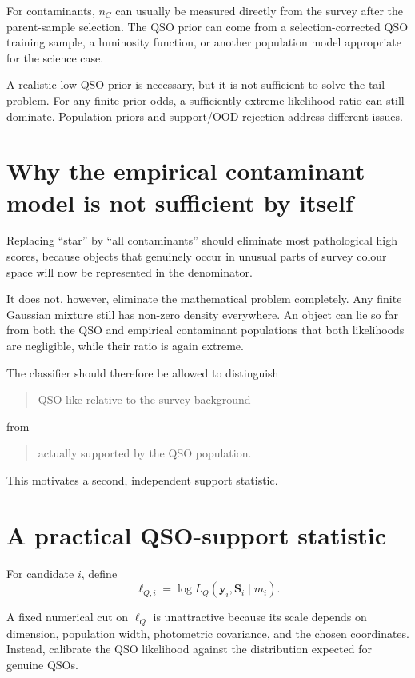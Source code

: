 \documentclass[11pt]{article}
\begin{document}
For contaminants, $n_C$ can usually be measured directly from the survey
after the parent-sample selection. The QSO prior can come from a
selection-corrected QSO training sample, a luminosity function, or another
population model appropriate for the science case.

A realistic low QSO prior is necessary, but it is not sufficient to solve the
tail problem. For any finite prior odds, a sufficiently extreme likelihood
ratio can still dominate. Population priors and support/OOD rejection address
different issues.

\section{Why the empirical contaminant model is not sufficient by itself}

Replacing ``star'' by ``all contaminants'' should eliminate most pathological
high scores, because objects that genuinely occur in unusual parts of survey
colour space will now be represented in the denominator.

It does not, however, eliminate the mathematical problem completely. Any
finite Gaussian mixture still has non-zero density everywhere. An object can
lie so far from both the QSO and empirical contaminant populations that both
likelihoods are negligible, while their ratio is again extreme.

The classifier should therefore be allowed to distinguish

\begin{quote}
QSO-like relative to the survey background
\end{quote}

from

\begin{quote}
actually supported by the QSO population.
\end{quote}

This motivates a second, independent support statistic.

\section{A practical QSO-support statistic}

For candidate $i$, define
%
\begin{equation}
\ell_{Q,i}
=
\log L_Q(\bm{y}_i,\bm{S}_i\mid m_i).
\end{equation}

A fixed numerical cut on $\ell_Q$ is unattractive because its scale depends on
dimension, population width, photometric covariance, and the chosen
coordinates. Instead, calibrate the QSO likelihood against the distribution
expected for genuine QSOs.
\end{document}
